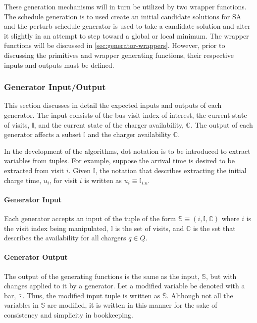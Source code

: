 \documentclass[11pt,a4paper,final]{article}
\newcommand{\I}{\mathbb{I}}                 %
\newcommand{\C}{\mathbb{C}}                 %
\newcommand{\Sol}{\mathbb{S}}               %
\newcommand{\Qset}{Q}                       %
\begin{document}
These generation mechanisms will in turn be utilized by two wrapper functions. The schedule generation is to used create
an initial candidate solutions for SA and the perturb schedule generator is used to take a candidate solution and alter
it slightly in an attempt to step toward a global or local minimum. The wrapper functions will be discussed in
\ref{sec:generator-wrappers}. However, prior to discussing the primitives and wrapper generating functions, their respective
inputs and outputs must be defined.

\subsubsection{Generator Input/Output}
\label{sec:generator-input-output}
This section discusses in detail the expected inputs and outputs of each generator. The input consists of the bus visit
index of interest, the current state of visits, \(\I\), and the current state of the charger availability, \(\C\). The
output of each generator affects a subset \(\I\) and the charger availability \(\C\).

In the development of the algorithms, dot notation is to be introduced to extract variables from tuples. For example,
suppose the arrival time is desired to be extracted from visit \(i\). Given \(\I\), the notation that describes extracting
the initial charge time, \(u_i\), for visit \(i\) is written as \(u_i \equiv \I_{i.u}\).

\paragraph{Generator Input}
\label{sec:org6a2c575}
Each generator accepts an input of the tuple of the form \(\Sol \equiv (i, \I, \C)\) where \(i\) is the visit index being
manipulated, \(\I\) is the set of visits, and \(\C\) is the set that describes the availability for all chargers \(q \in
\Qset\).

\paragraph{Generator Output}
\label{sec:org1fa17d3}
The output of the generating functions is the same as the input, \(\Sol\), but with changes applied to it by a generator.
Let a modified variable be denoted with a bar, \(\bar{\cdot}\). Thus, the modified input tuple is written as \(\bar{\Sol}\).
Although not all the variables in \(\Sol\) are modified, it is written in this manner for the sake of consistency and
simplicity in bookkeeping.
\end{document}
